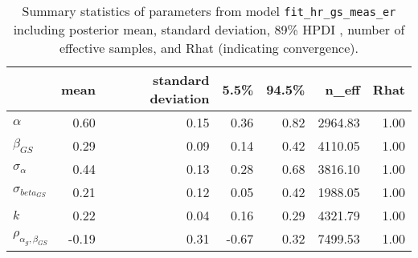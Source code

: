\begin{table}[ht]
\centering
\begin{tabular}{lrrrrrr}
  \hline
 & mean & standard deviation & 5.5\% & 94.5\% & n\_eff & Rhat \\ 
  \hline
$\alpha$ & 0.60 & 0.15 & 0.36 & 0.82 & 2964.83 & 1.00 \\ 
  $\beta_{GS}$ & 0.29 & 0.09 & 0.14 & 0.42 & 4110.05 & 1.00 \\ 
  $\sigma_{\alpha}$ & 0.44 & 0.13 & 0.28 & 0.68 & 3816.10 & 1.00 \\ 
  $\sigma_{beta_{GS}}$ & 0.21 & 0.12 & 0.05 & 0.42 & 1988.05 & 1.00 \\ 
  $k$ & 0.22 & 0.04 & 0.16 & 0.29 & 4321.79 & 1.00 \\ 
  $\rho_{\alpha_g,\beta_{GS}}$ & -0.19 & 0.31 & -0.67 & 0.32 & 7499.53 & 1.00 \\ 
   \hline
\end{tabular}
\caption{Summary statistics of parameters from model  \texttt{fit\_hr\_gs\_meas\_er} including posterior mean, standard deviation, 89\% HPDI , number of effective samples, and Rhat (indicating convergence).} 
\label{tab:precis_hr_gs_me}
\end{table}
